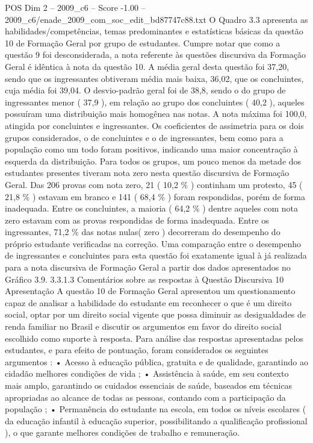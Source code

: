 \begin{textsample}{POS Dim 2 – 2009\_c6 – Score -1.00 – 2009\_c6/enade\_2009\_com\_soc\_edit\_bd87747c88.txt}
O Quadro 3.3 apresenta as habilidades/competências, temas predominantes e estatísticas básicas da questão 10 de Formação Geral por grupo de estudantes.
Cumpre notar que como a questão 9 foi desconsiderada, a nota referente às questões discursiva da Formação Geral é idêntica à nota da questão 10.
A média geral desta questão foi 37,20, sendo que os ingressantes obtiveram média mais baixa, 36,02, que os concluintes, cuja média foi 39,04.
O desvio-padrão geral foi de 38,8, sendo o do grupo de ingressantes menor ( 37,9 ), em relação ao grupo dos concluintes ( 40,2 ), aqueles possuíram uma distribuição mais homogênea nas notas.
A nota máxima foi 100,0, atingida por concluintes e ingressantes.
Os coeficientes de assimetria para os dois grupos considerados, o de concluintes e o de ingressantes, bem como para a população como um todo foram positivos, indicando uma maior concentração à esquerda da distribuição.
Para todos os grupos, um pouco menos da metade dos estudantes presentes tiveram nota zero nesta questão discursiva de Formação Geral.
Das 206 provas com nota zero, 21 ( 10,2 \% ) continham um protesto, 45 ( 21,8 \% ) estavam em branco e 141 ( 68,4 \% ) foram respondidas, porém de forma inadequada.
Entre os concluintes, a maioria ( 64,2 \% ) dentre aqueles com nota zero estavam com as provas respondidas de forma inadequada.
Entre os ingressantes, 71,2 \% das notas nulas( zero ) decorreram do desempenho do próprio estudante verificadas na correção.
Uma comparação entre o desempenho de ingressantes e concluintes para esta questão foi exatamente igual à já realizada para a nota discursiva de Formação Geral a partir dos dados apresentados no Gráfico 3.9. 3.3.1.3 Comentários sobre as respostas à Questão Discursiva 10 Apresentação A questão 10 de Formação Geral apresentou um questionamento capaz de analisar a habilidade do estudante em reconhecer o que é um direito social, optar por um direito social vigente que possa diminuir as desigualdades de renda familiar no Brasil e discutir os argumentos em favor do direito social escolhido como suporte à resposta.
Para análise das respostas apresentadas pelos estudantes, e para efeito de pontuação, foram considerados os seguintes argumentos : • Acesso à educação pública, gratuita e de qualidade, garantindo ao cidadão melhores condições de vida ; • Assistência à saúde, em seu contexto mais amplo, garantindo os cuidados essenciais de saúde, baseados em técnicas apropriadas ao alcance de todas as pessoas, contando com a participação da população ; • Permanência do estudante na escola, em todos os níveis escolares ( da educação infantil à educação superior, possibilitando a qualificação profissional ), o que garante melhores condições de trabalho e remuneração.

\end{textsample}
